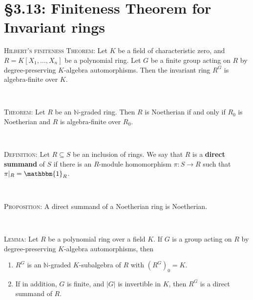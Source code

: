 \documentclass[12pt]{amsart}
\newcommand{\N}{\mathbb{N}}
\newcommand{\1}{\mathbbm{1}}
\newcommand{\showsol}[1]{\def\displaysol{#1}}
\begin{document}
\showsol{0}
	
	\thispagestyle{empty}
	
	\section*{\S3.13: Finiteness Theorem for Invariant rings}	

\begin{framed}

\textsc{Hilbert's finiteness Theorem:} Let $K$ be a field of characteristic zero, and $R=K[X_1,\dots,X_n]$ be a polynomial ring. Let $G$ be a finite group acting on $R$ by degree-preserving $K$-algebra automorphisms. Then the invariant ring $R^G$ is algebra-finite over $K$.

\



\noindent \textsc{Theorem:} Let $R$ be an $\N$-graded ring. Then $R$ is Noetherian if and only if $R_0$ is Noetherian and $R$ is algebra-finite over $R_0$.

\


\noindent \textsc{Definition:} Let $R\subseteq S$ be an inclusion of rings. We say that $R$ is a \textbf{direct summand} of $S$ if there is an $R$-module homomorphism $\pi:S\to R$ such that $\pi|_R=\1_R$.

\

\noindent \textsc{Proposition:} A direct summand of a Noetherian ring is Noetherian. 

\

\noindent \textsc{Lemma:} Let $R$ be a polynomial ring over a field $K$. If $G$ is a group acting on $R$ by degree-preserving $K$-algebra automorphisms, then
\begin{enumerate}
\item $R^G$ is an $\N$-graded $K$-subalgebra of $R$ with $(R^G)_0=K$.
\item If in addition, $G$ is finite, and $|G|$ is invertible in $K$, then $R^G$ is a direct summand of $R$.
\end{enumerate}
 \end{framed}
\end{document}
